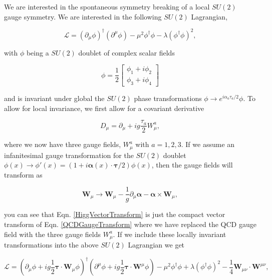 We are interested in the spontaneous symmetry breaking of a local $SU(2)$ gauge symmetry. We are interested in the following $SU(2)$ Lagrangian,

\begin{equation}\label{HiggsLagrangian}
\mathcal{L}=(\partial_\mu\phi)^\dagger(\partial^\mu\phi)-\mu^2\phi^\dagger\phi-\lambda(\phi^\dagger\phi)^2,
\end{equation}

with $\phi$ being a $SU(2)$ doublet of complex scalar fields

\begin{equation}
\phi=\frac{1}{2}
\begin{bmatrix}
\phi_1+i\phi_2 \\
\phi_3+i\phi_4
\end{bmatrix}
\end{equation} 

and is invariant under global the $SU(2)$ phase transformations $\phi\rightarrow e^{i\alpha_a\tau_a/2}\phi$. To allow for local invariance, we first allow for a covariant derivative

\begin{equation}
D_\mu=\partial_\mu+ig\frac{\tau_a}{2}W_\mu^a,
\end{equation}

where we now have three gauge fields, $W_\mu^a$ with $a=1,2,3$. If we assume an infanitesimal gauge transformation for the $SU(2)$ doublet $\phi(x)\rightarrow\phi'(x)=(1 +i\boldsymbol{\alpha}(x)\cdot\boldsymbol{\tau}/2)\phi(x)$, then the gauge fields will transform as

\begin{equation}\label{HiggVectorTransform}
\boldsymbol{W}_\mu\rightarrow\boldsymbol{W}_\mu-\frac{1}{g}\partial_\mu\boldsymbol{\alpha}-\boldsymbol{\alpha}\times\boldsymbol{W}_\mu,
\end{equation}

you can see that Eqn. \ref{HiggVectorTransform} is just the compact vector transform of Eqn. \ref{QCDGaugeTransform} where we have replaced the QCD gauge field with the three gauge fields $W_\mu^a$. If we include these locally invariant transformations into the above $SU(2)$ Lagrangian we get

\begin{equation}\label{HiggsInvariantL}
\mathcal{L}=(\partial_\mu\phi+ig\frac{1}{2}\boldsymbol{\tau}\cdot\boldsymbol{W}_\mu\phi)^\dagger(\partial^\mu\phi+ig\frac{1}{2}\boldsymbol{\tau}\cdot\boldsymbol{W}^\mu\phi)-\mu^2\phi^\dagger\phi+\lambda(\phi^\dagger\phi)^2-\frac{1}{4}\boldsymbol{W}_{\mu\nu}\cdot\boldsymbol{W}^{\mu\nu},
\end{equation}

